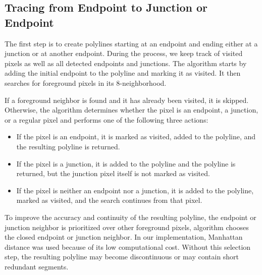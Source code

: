\subsection{Tracing from Endpoint to Junction or Endpoint}

The first step is to create polylines starting at an endpoint and ending either at a junction or at another endpoint. During the process, we keep track of visited pixels as well as all detected endpoints and junctions. The algorithm starts by adding the initial endpoint to the polyline and marking it as visited. It then searches for foreground pixels in its 8-neighborhood. 

If a foreground neighbor is found and it has already been visited, it is skipped. Otherwise, the algorithm determines whether the pixel is an endpoint, a junction, or a regular pixel and performs one of the following three actions:

\begin{itemize}
	\item If the pixel is an endpoint, it is marked as visited, added to the polyline, and the resulting polyline is returned.
	\item If the pixel is a junction, it is added to the polyline and the polyline is returned, but the junction pixel itself is not marked as visited.
	\item If the pixel is neither an endpoint nor a junction, it is added to the polyline, marked as visited, and the search continues from that pixel.
\end{itemize}

To improve the accuracy and continuity of the resulting polyline, the endpoint or junction neighbor is prioritized over other foreground pixels, algorithm chooses the closed endpoint or junction neighbor. In our implementation, Manhattan distance was used because of its low computational cost. Without this selection step, the resulting polyline may become discontinuous or may contain short redundant segments.


